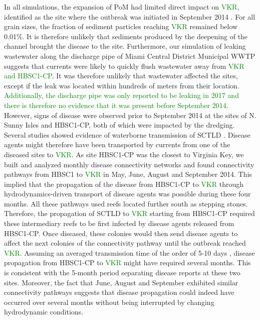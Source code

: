 \documentclass[preprint,12pt,authoryear]{elsarticle}
\newcommand{\modif}[1]{\textcolor{green}{#1}}
\begin{document}
In all simulations, the expansion of PoM had limited direct impact on \modif{VKR}, identified as the site where the outbreak was initiated in September 2014 \citep{precht2016unprecedented}. For all grain sizes, the fraction of sediment particles reaching \modif{VKR} remained below 0.01\%. It is therefore unlikely that sediments produced by the deepening of the channel brought the disease to the site. Furthermore, our simulation of leaking wastewater along the discharge pipe of Miami Central District Municipal WWTP suggests that currents were likely to quickly flush wastewater away from \modif{VKR and HBSC1-CP}. It was therefore unlikely that wastewater affected the sites, except if the leak was located within hundreds of meters from their location. \modif{Additionally, the discharge pipe was only reported to be leaking in 2017 \citep{staletovich2017} and there is therefore no evidence that it was present before September 2014}. However, signs of disease were observed prior to September 2014 at the sites of N. Sunny Isles and HBSC1-CP, both of which were impacted by the dredging. Several studies showed evidence of waterborne transmission of SCTLD \citep{aeby2019pathogenesis,dobbelaere2020coupled,eaton2021measuring,meiling2021variable}. Disease agents might therefore have been transported by currents from one of the diseased sites to \modif{VKR}. As site HBSC1-CP was the closest to Virginia Key, we built and analyzed monthly disease connectivity networks and found connectivity pathways from HBSC1 to \modif{VKR} in May, June, August and September 2014. This implied that the propagation of the disease from HBSC1-CP to \modif{VKR} through hydrodynamics-driven transport of disease agents was possible during these four months. All these pathways used reefs located further south as stepping stones. Therefore, the propagation of SCTLD to \modif{VKR} starting from HBSC1-CP required these intermediary reefs to be first infected by disease agents released from HBSC1-CP. Once diseased, these colonies would then send disease agents to affect the next colonies of the connectivity pathway until the outbreak reached \modif{VKR}. Assuming an averaged transmission time of the order of 5-10 days \citep{dobbelaere2020coupled}, disease propagation from HBSC1-CP to \modif{VKR} might have required several months. This is consistent with the 5-month period separating disease reports at these two sites. Moreover, the fact that June, August and September exhibited similar connectivity pathways suggests that disease propagation could indeed have occurred over several months without being interrupted by changing hydrodynamic conditions.
\end{document}
